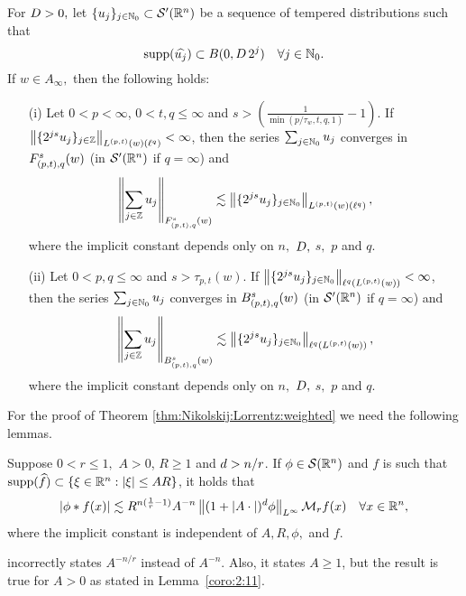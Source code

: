\begin{theorem}\label{thm:Nikolskij:Lorrentz:weighted} For $\A> 0,$ let $\{u_j\}_{j \in \naz} \subset \mathcal{S}'(\rn)$ be a sequence of tempered distributions such that
\begin{equation*}
\supp(\widehat{u_j}) \subset B(0, \A\, 2^j ) \quad \forall j \in \naz.
\end{equation*}
If $w\in A_\infty,$ then the following holds:  
\begin{enumerate}
\item[(i)]\label{item:thh:Nikolskij:Lorrentz:TL} Let $0 < p < \infty$, $0 < t,q \leq \infty$ and $s > \left(\frac{1}{\min(p/\tau_w,t,q,1)} - 1 \right)$. If $\norm{\{2^{js} u_j\}_{j\in\ent}}{L^{(p,t)}(w)(\ell^{q})} < \infty$, then the series $\sum_{j \in \naz} u_j$ converges in $\itlw{(p,t)}{s}{q}{w}$ (in $\mathcal{S}'(\rn)$ if $q=\infty$) and 
\begin{equation*}
\norm{\sum_{j \in \ent} u_j}{\itlw{(p,t)}{s}{q}{w}} \lesssim  \norm{\{2^{js} u_j\}_{j\in\naz}}{L^{(p,t)}(w)(\ell^{q})},
\end{equation*}
where the implicit constant depends only on $n,$ $\A,$ $s,$ $p$ and  $q.$
\item[(ii)]\label{item:thh:Nikolskij:Lorrentz:B} Let $0 < p, q \leq \infty$ and $s > \tau_{p,t}(w)$. If $\norm{\{2^{js} u_j\}_{j\in\naz}}{\ell^{q}(L^{(p,t)}(w))} < \infty$, then the series $\sum_{j \in \naz} u_j$ converges in  $\ibesw{(p,t)}{s}{q}{w}$ (in $\mathcal{S}'(\rn)$ if $q=\infty$) and 
\begin{equation*}
\norm{\sum_{j \in \ent} u_j}{\ibesw{(p,t)}{s}{q}{w}} \lesssim  \norm{\{2^{js} u_j\}_{j\in\naz}}{\ell^{q}(L^{(p,t)}(w))},
\end{equation*}
where the implicit constant depends only on $n,$ $\A,$ $s,$ $p$ and $q.$
\end{enumerate}
\end{theorem}
For the proof of Theorem \ref{thm:Nikolskij:Lorrentz:weighted} we need the following lemmas.

\begin{lemma}\label{coro:2:11}
Suppose $0 < r \leq 1,$  $A >0$, $R \geq 1$ and $\ex > n/r$. If $\phi \in \sw$ and $f$ is such that  $\supp(\widehat{f}) \subset \{\xi\in\rn:\abs{\xi}\le AR\}$, it holds that
\begin{equation*}
|\phi * f(x)| \lesssim R^{n (\frac{1}{r}  -1)} A^{-n} \norm{(1 + |A \cdot|)^\ex \phi}{L^\infty}  \M_rf(x) \quad \forall x \in \rn,
\end{equation*}
where the implicit constant is independent of $A, R, \phi,$ and $f.$  
\end{lemma}
\begin{remark} \cite[Corollary 2.11]{MR837335} incorrectly states $A^{-n/r}$ instead of $ A^{-n}$. Also, it states $A \geq 1$, but the result is true for $A >0$ as stated in Lemma~\ref{coro:2:11}.
\end{remark}

